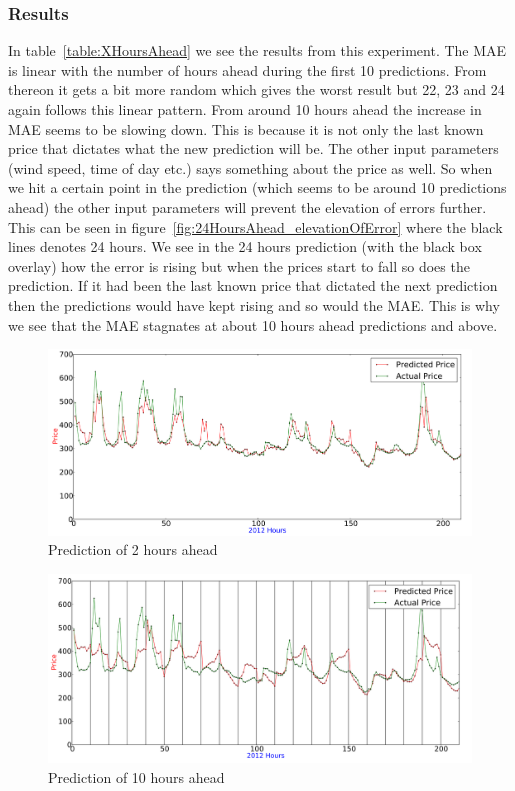 \subsubsection{Results}
In table~\ref{table:XHoursAhead} we see the results from this experiment. The MAE is linear with the number of hours ahead during the first 10 predictions. From thereon it gets a bit more random which gives the worst result but 22, 23 and 24 again follows this linear pattern. From around 10 hours ahead the increase in MAE seems to be slowing down. This is because it is not only the last known price that dictates what the new prediction will be. The other input parameters (wind speed, time of day etc.) says something about the price as well. So when we hit a certain point in the prediction (which seems to be around 10 predictions ahead) the other input parameters will prevent the elevation of errors further. This can be seen in figure~\ref{fig:24HoursAhead_elevationOfError} where the black lines denotes 24 hours. We see in the 24 hours prediction (with the black box overlay) how the error is rising but when the prices start to fall so does the prediction. If it had been the last known price that dictated the next prediction then the predictions would have kept rising and so would the MAE. This is why we see that the MAE stagnates at about 10 hours ahead predictions and above.

\begin{figure}[H]
\centering
\includegraphics[width=\linewidth,natwidth=898,natheight=587]{billeder/PriceExperimentalAnalysis/2HoursAheadForecast.png}
\caption{Prediction of 2 hours ahead}
\label{fig:2HoursAhead}
\end{figure}

\begin{figure}[H]
\centering
\includegraphics[width=\linewidth,natwidth=898,natheight=587]{billeder/PriceExperimentalAnalysis/10HoursAhead.png}
\caption{Prediction of 10 hours ahead}
\label{fig:10HoursAhead}
\end{figure}

